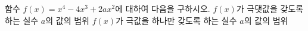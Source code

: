 함수 $f(x)=x^4-4x^3+2ax^2$에 대하여 다음을 구하시오.
 $f(x)$가 극댓값을 갖도록 하는 실수 $a$의 값의 범위
 $f(x)$가 극값을 하나만 갖도록 하는 실수 $a$의 값의 범위

